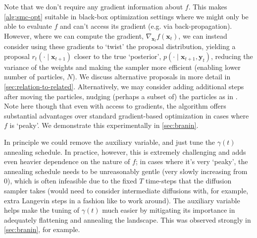 \begin{remark} \label{rem:grad-free}
    Note that we don't require any gradient information about $f$. This makes \ref{alg:smc-opt}
    suitable in black-box optimization settings where we might only be able to evaluate $f$ and
    can't access its gradient (e.g. via back-propagation). However, where we can compute the
    gradient, $\nabla_{\mathbf{x}_{t}} f(\mathbf{x}_{t})$, we can instead consider using
    these gradients to `twist' \parencite{wuPracticalAsymptoticallyExact2023} the proposal
    distribution, yielding a proposal $r_t(\cdot \mid \mathbf{x}_{t+1})$ closer to the true
    `posterior', $p(\cdot \mid \mathbf{x}_{t+1}, \mathbf{y}_t)$, reducing the variance of the
    weights and making the sampler more efficient (enabling lower number of particles, $N$).
    We discuss alternative proposals in more detail in \ref{sec:relation-to-related}.
    Alternatively, we may consider adding additional steps after moving the particles, nudging
    (perhaps a subset of) the particles as in \textcite{akyildizNudgingParticleFilter2020}.
    Note here though that even with access to gradients, the algorithm offers substantial
    advantages over standard gradient-based optimization in cases where $f$ is `peaky'.
    We demonstrate this experimentally in \ref{sec:branin}.
\end{remark}

\begin{remark}
    In principle we could remove the auxiliary variable, and just tune the $\gamma(t)$
    annealing schedule. In practice, however, this is extremely challenging and adds even heavier
    dependence on the nature of $f$; in cases where it's very `peaky', the annealing schedule needs
    to be unreasonably gentle (very slowly increasing from 0), which is often infeasible due to the
    fixed $T$ time-steps that the diffusion sampler takes (would need to consider intermediate
    diffusions with, for example, extra Langevin steps in a fashion like
    \textcite{janatiDivideandConquerPosteriorSampling2024} to work around). The auxiliary variable
    helps make the tuning of $\gamma(t)$ much easier by mitigating its importance in adequately
    flattening and annealing the landscape. This was observed strongly in \ref{sec:branin}, for
    example.
\end{remark}


